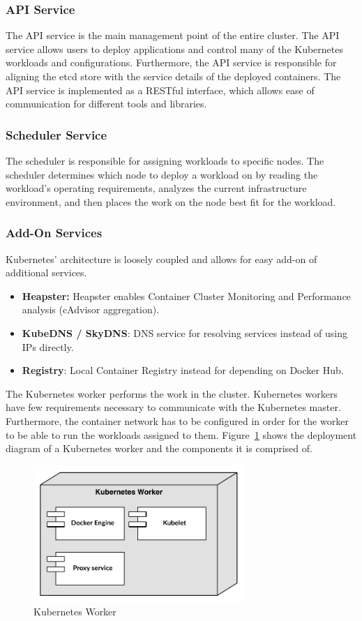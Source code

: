 \subsubsection*{API Service}
The API service is the main management point of the entire cluster. The API service allows users to deploy applications and control many of the Kubernetes workloads and configurations. Furthermore, the API service is responsible for aligning the etcd store with the service details of the deployed containers. The API service is implemented as a RESTful interface, which allows ease of communication for different tools and libraries.


\subsubsection*{Scheduler Service}
The scheduler is responsible for assigning workloads to specific nodes. The scheduler determines which node to deploy a workload on by reading the workload's operating requirements, analyzes the current infrastructure environment, and then places the work on the node best fit for the workload.

\subsubsection*{Add-On Services}
Kubernetes' architecture is loosely coupled and allows for easy add-on of additional services. 
\begin{itemize}
  \item \textbf{Heapster:} Heapster enables Container Cluster Monitoring and Performance analysis (cAdvisor aggregation).
  \item \textbf{KubeDNS / SkyDNS}: DNS service for resolving services instead of using IPs directly.
  \item \textbf{Registry}: Local Container Registry instead for depending on Docker Hub. 
\end{itemize}


\noindent
The Kubernetes worker performs the work in the cluster. Kubernetes workers have few requirements necessary to communicate with the Kubernetes master. Furthermore, the container network has to be configured in order for the worker to be able to run the workloads assigned to them. Figure~\ref{fig:kubernetes_slave_report} shows the deployment diagram of a Kubernetes worker and the components it is comprised of.

\begin{figure}[H]
    \centering
    \includegraphics[width=8cm]{figures/kubernetes/kubenetes_slave}
    \caption{Kubernetes Worker}
    \label{fig:kubernetes_slave_report}
\end{figure}

